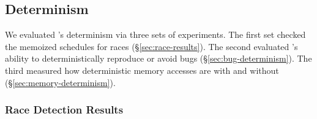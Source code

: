 

\subsection{Determinism}\label{sec:tern-determinism}

We evaluated \tern's determinism via three sets of experiments.  The first
set checked the memoized schedules for races (\S\ref{sec:race-results}).
The second evaluated \tern's ability to deterministically reproduce or avoid
bugs (\S\ref{sec:bug-determinism}).  The third measured how deterministic
memory accesses are with and without
\tern (\S\ref{sec:memory-determinism}).

\subsubsection{Race Detection Results}\label{sec:tern-race-results}


